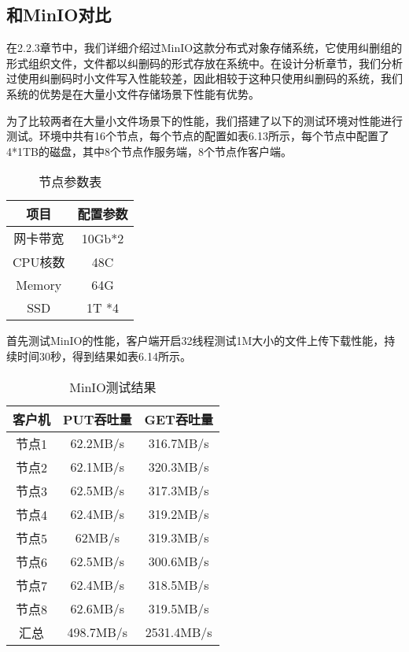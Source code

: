 \subsection{和MinIO对比}%
在2.2.3章节中，我们详细介绍过MinIO这款分布式对象存储系统，它使用纠删组的形式组织文件，文件都以纠删码的形式存放在系统中。在设计分析章节，我们分析过使用纠删码时小文件写入性能较差，因此相较于这种只使用纠删码的系统，我们系统的优势是在大量小文件存储场景下性能有优势。

为了比较两者在大量小文件场景下的性能，我们搭建了以下的测试环境对性能进行测试。环境中共有16个节点，每个节点的配置如表6.13所示，每个节点中配置了4*1TB的磁盘，其中8个节点作服务端，8个节点作客户端。

\begin{table}[h]
    \centering
    \caption{节点参数表}
    \begin{tabular}{cc}
      \toprule
      项目   & 配置参数   \\
      \midrule
      网卡带宽 & 10Gb*2  \\
      CPU核数  & 48C     \\
      Memory  & 64G      \\
      SSD     & 1T *4   \\
      \bottomrule
    \end{tabular}
\end{table}

首先测试MinIO的性能，客户端开启32线程测试1M大小的文件上传下载性能，持续时间30秒，得到结果如表6.14所示。

\begin{table}[h]
    \centering
    \caption{MinIO测试结果}
    \begin{tabular}{ccc}
      \toprule
      客户机   & PUT吞吐量  & GET吞吐量 \\
      \midrule
      节点1  & 62.2MB/s  & 316.7MB/s \\
      节点2  & 62.1MB/s  & 320.3MB/s \\
      节点3  & 62.5MB/s  & 317.3MB/s \\
      节点4  & 62.4MB/s  & 319.2MB/s \\
      节点5  & 62MB/s    & 319.3MB/s \\
      节点6  & 62.5MB/s  & 300.6MB/s \\
      节点7  & 62.4MB/s  & 318.5MB/s \\
      节点8  & 62.6MB/s  & 319.5MB/s \\
      汇总   & 498.7MB/s & 2531.4MB/s \\
      \bottomrule
    \end{tabular}
\end{table}

